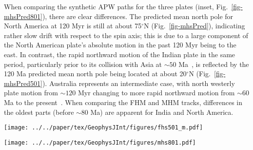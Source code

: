 When comparing the synthetic APW paths for the three plates (inset,
Fig.~\ref{fig-mhsPred801}), there are clear differences. The predicted mean
north pole for North America at 120 Myr is still at about 75$^{\circ}$N
(Fig.~\ref{fig-mhsPred}), indicating rather slow drift with respect to the spin
axis; this is due to a large component of the North American plate's absolute
motion in the past 120 Myr being to the east. In contrast, the rapid northward
motion of the Indian plate in the same period, particularly prior to its
collision with Asia at ${\sim}50$ Ma~\citep{N10}, is reflected by
the 120 Ma predicted mean north pole being located at about 20$^{\circ}$N
(Fig.~\ref{fig-mhsPred501}). Australia represents an intermediate case, with
north westerly plate motion from ${\sim}120$ Myr changing to more
rapid northward motion from ${\sim}60$ Ma to the present~\citep{W07}.
When comparing the FHM and MHM tracks, differences in the oldest parts (before
${\sim}80$ Ma) are apparent for India and North America.

\begin{figure*}
\centering
\texttt{[image: ../../paper/tex/GeophysJInt/figures/fhs501\_m.pdf]}
\caption[120 Ma MHM vs FHS predicted APWP of India]{MHM predicted
120 Ma APWP (solid line) for India through the
India\textendash{}Somalia\textendash{}Nubia\textendash{}Mantle plate circuit.
Its age step is 5 Myr. The dashed line is the FHM predicted path shown for
comparison. The inset shows paths for fast moving India and also much slower
moving North America shown in Fig.~\ref{fig-mhsPred}.}\label{fig-mhsPred501}
\end{figure*}

\begin{figure*}
\centering
\texttt{[image: ../../paper/tex/GeophysJInt/figures/mhs801.pdf]}
\caption[120 Ma MHM vs FHM predicted APWP of Australia]{MHM
predicted 120 Ma APWP (solid line) for Australia through the
Australia\textendash{}East
Antarctica\textendash{}Somalia\textendash{}Nubia\textendash{}Mantle plate
circuit. Its age step is 5 Myr. The dashed line is the FHM predicted path shown
for comparison. The inset shows paths for fast moving India shown in
Fig.~\ref{fig-mhsPred501}, much slower moving North America shown in
Fig.~\ref{fig-mhsPred}, and also relatively intermediate moving
Australia.}\label{fig-mhsPred801}
\end{figure*}

